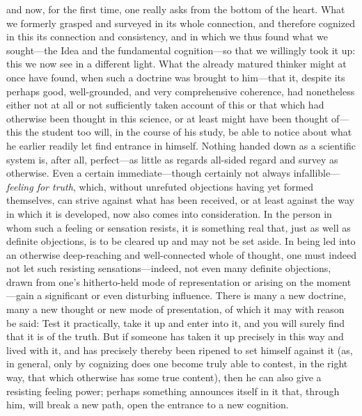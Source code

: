 \documentclass[12pt,a4paper]{book}
\begin{document}
and now, for the first time, one really asks from the bottom of the heart. What we formerly grasped
and surveyed in its whole connection, and therefore cognized in this its connection and consistency,
and in which we thus found what we sought---the Idea and the fundamental cognition---so that we
willingly took it up: this we now see in a different light. What the already matured thinker might at
once have found, when such a doctrine was brought to him---that it, despite its perhaps good,
well-grounded, and very comprehensive coherence, had nonetheless either not at all or not
sufficiently taken account of this or that which had otherwise been thought in this science, or at
least might have been thought of---this the student too will, in the course of his study, be able to
notice about what he earlier readily let find entrance in himself. Nothing handed down as a
scientific system is, after all, perfect---as little as regards all-sided regard and survey as
otherwise. Even a certain immediate---though certainly not always infallible---\emph{feeling for
truth}, which, without unrefuted objections having yet formed themselves, can strive against what has
been received, or at least against the way in which it is developed, now also comes into
consideration. In the person in whom such a feeling or sensation resists, it is something real that,
just as well as definite objections, is to be cleared up and may not be set aside. In being led into
an otherwise deep-reaching and well-connected whole of thought, one must indeed not let such resisting
sensations---indeed, not even many definite objections, drawn from one's hitherto-held mode of
representation or arising on the moment---gain a significant or even disturbing influence. There is
many a new doctrine, many a new thought or new mode of presentation, of which it may with reason be
said: Test it practically, take it up and enter into it, and you will surely find that it is of the
truth. But if someone has taken it up precisely in this way and lived with it, and has precisely
thereby been ripened to set himself against it (as, in general, only by cognizing does one become
truly able to contest, in the right way, that which otherwise has some true content), then he can also
give a resisting feeling power; perhaps something announces itself in it that, through him, will break
a new path, open the entrance to a new cognition.
\end{document}
